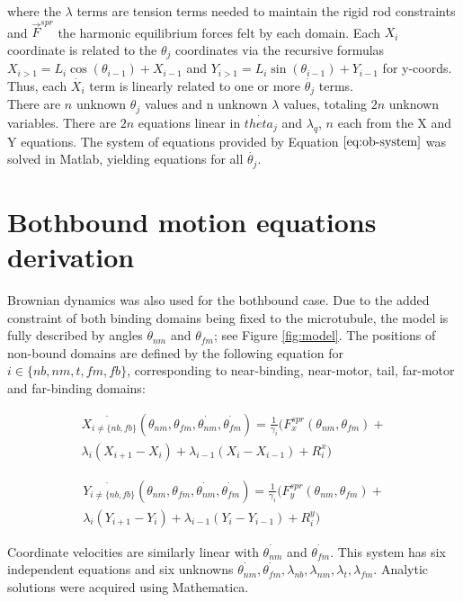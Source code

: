 \documentclass[9pt,twocolumn,twoside]{pnas-new}
\begin{document}
{  where the $\lambda$ terms are tension terms needed to maintain the rigid rod constraints and $\vec{F}^{spr}$ the harmonic equilibrium forces felt by each domain. Each $X_i$ coordinate is related to the $\theta_j$ coordinates via the recursive formulas $X_{i>1} = L_i\cos(\theta_{i-1})+X_{i-1}$ and $Y_{i>1} = L_i\sin(\theta_{i-1})+Y_{i-1}$ for y-coords. Thus, each $\dot{X_i}$ term is linearly related to one or more $\dot{\theta_j}$ terms.\\

  There are $n$ unknown $\theta_j$ values and n unknown $\lambda$ values, totaling $2n$ unknown variables. There are $2n$ equations linear in $\dot{theta_j}$ and $\lambda_q$, $n$ each from the X and Y equations. The system of equations provided by Equation $\ref{eq:ob-system}$ was solved in Matlab, yielding equations for all $\dot{\theta_j}$.

  \section*{Bothbound motion equations derivation}
  Brownian dynamics was also used for the bothbound case. Due to the added constraint of both binding domains being fixed to the microtubule, the model is fully described by angles $\theta_{nm}$ and $\theta_{fm}$; see Figure \ref{fig:model}. The positions of non-bound domains are defined by the following equation for $i \in \{nb, nm, t, fm, fb\}$, corresponding to near-binding, near-motor, tail, far-motor and far-binding domains:

  \begin{multline}
    \dot{X_{i\neq\{nb, fb\}}}\left(\theta_{nm},\theta_{fm}, \dot{\theta_{nm}}, \dot{\theta_{fm}}\right) = \frac{1}{\gamma_i}\big(F^{spr}_x(\theta_{nm}, \theta_{fm}) + \\
    \lambda_i\left(X_{i+1}-X_i\right) + \lambda_{i-1}\left(X_i-X_{i-1}\right) + R^x_i\big)
    \label{eq:bb-system}
  \end{multline}

  \begin{multline}
    \dot{Y_{i\neq\{nb, fb\}}}\left(\theta_{nm},\theta_{fm}, \dot{\theta_{nm}}, \dot{\theta_{fm}}\right) = \frac{1}{\gamma_i}\big(F^{spr}_y(\theta_{nm}, \theta_{fm}) + \\
    \lambda_i\left(Y_{i+1}-Y_i\right) + \lambda_{i-1}\left(Y_i-Y_{i-1}\right) + R^y_i\big)
    \label{eq:bb-system}
  \end{multline}

  Coordinate velocities are similarly linear with $\dot{\theta_{nm}}$ and $\dot{\theta_{fm}}$. This system has six independent equations and six unknowns $\dot{\theta_{nm}}, \dot{\theta_{fm}}, \lambda_{nb}, \lambda_{nm}, \lambda_{t}, \lambda_{fm}$. Analytic solutions were acquired using Mathematica.

}
\end{document}
